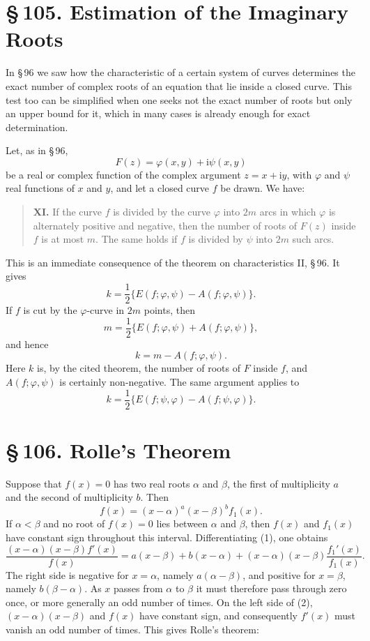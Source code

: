 \documentclass[11pt]{article}
\providecommand{\sect}[2]{\section*{\S\,#1. #2}}
\providecommand{\ii}{\mathrm{i}}
\begin{document}
\sect{105}{Estimation of the Imaginary Roots}

In \S\,96 we saw how the characteristic of a certain system of curves determines the exact number of complex roots of an equation that lie inside a closed curve. This test too can be simplified when one seeks not the exact number of roots but only an upper bound for it, which in many cases is already enough for exact determination.

Let, as in \S\,96,
\begin{equation}
        F(z)=\varphi(x,y)+\ii\psi(x,y)
\tag{1}
\end{equation}
be a real or complex function of the complex argument $z=x+\ii y$, with $\varphi$ and $\psi$ real functions of $x$ and $y$, and let a closed curve $f$ be drawn. We have:

\begin{quote}
\textbf{XI.} If the curve $f$ is divided by the curve $\varphi$ into $2m$ arcs in which $\varphi$ is alternately positive and negative, then the number of roots of $F(z)$ inside $f$ is at most $m$. The same holds if $f$ is divided by $\psi$ into $2m$ such arcs.
\end{quote}

This is an immediate consequence of the theorem on characteristics II, \S\,96. It gives
\[
        k=\frac12\{E(f;\varphi,\psi)-A(f;\varphi,\psi)\}.
\]
If $f$ is cut by the $\varphi$-curve in $2m$ points, then
\[
        m=\frac12\{E(f;\varphi,\psi)+A(f;\varphi,\psi)\},
\]
and hence
\[
        k=m-A(f;\varphi,\psi).
\]
Here $k$ is, by the cited theorem, the number of roots of $F$ inside $f$, and $A(f;\varphi,\psi)$ is certainly non-negative. The same argument applies to
\[
        k=\frac12\{E(f;\psi,\varphi)-A(f;\psi,\varphi)\}.
\]

\sect{106}{Rolle's Theorem}

Suppose that $f(x)=0$ has two real roots $\alpha$ and $\beta$, the first of multiplicity $a$ and the second of multiplicity $b$. Then
\begin{equation}
        f(x)=(x-\alpha)^a(x-\beta)^b f_1(x).
\tag{1}
\end{equation}
If $\alpha<\beta$ and no root of $f(x)=0$ lies between $\alpha$ and $\beta$, then $f(x)$ and $f_1(x)$ have constant sign throughout this interval. Differentiating (1), one obtains
\begin{equation}
\frac{(x-\alpha)(x-\beta)f'(x)}{f(x)}
=a(x-\beta)+b(x-\alpha)+(x-\alpha)(x-\beta)\frac{f_1'(x)}{f_1(x)}.
\tag{2}
\end{equation}
The right side is negative for $x=\alpha$, namely $a(\alpha-\beta)$, and positive for $x=\beta$, namely $b(\beta-\alpha)$. As $x$ passes from $\alpha$ to $\beta$ it must therefore pass through zero once, or more generally an odd number of times. On the left side of (2), $(x-\alpha)(x-\beta)$ and $f(x)$ have constant sign, and consequently $f'(x)$ must vanish an odd number of times. This gives Rolle's theorem:
\end{document}
